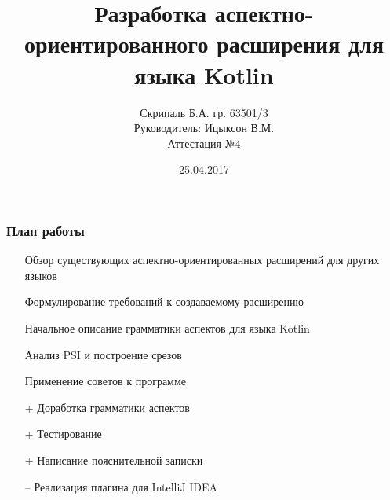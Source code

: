 \documentclass{beamer}
\begin{document}
	
	\title[Разработка АОП для Kotlin]
	{Разработка аспектно-ориентированного расширения для языка Kotlin}
	
	\author[Б.А. Скрипаль]{
		Скрипаль Б.А. гр. 63501/3\\
		Руководитель: Ицыксон В.М.\\
		Аттестация №4
	}
	\date[25.04.2017]{25.04.2017}  
	\frame{\titlepage} 
	
	\begin{frame}
		\frametitle{План работы}
		\begin{itemize}
			\item [\checkmark] Обзор существующих аспектно-ориентированных 
			расширений для других языков
			\item [\checkmark] Формулирование требований к создаваемому 
			расширению
			\item [\checkmark] Начальное описание грамматики аспектов для языка 
			Kotlin
			\item [\checkmark] Анализ PSI и построение срезов
			\item [\checkmark] Применение советов к программе
			\item [+] Доработка грамматики аспектов
			\item [+] Тестирование
			\item [+] Написание пояснительной записки
			\item [--] Реализация плагина для IntelliJ IDEA
		\end{itemize}
	\end{frame}
	
\end{document}
